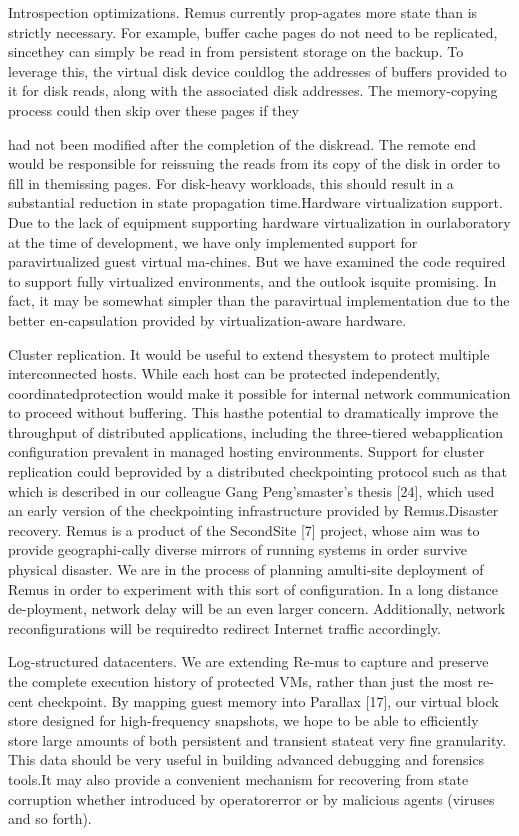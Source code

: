 Introspection optimizations. Remus currently prop-agates more state than is strictly necessary. For example,
buffer cache pages do not need to be replicated, sincethey can simply be read in from persistent storage on the
backup. To leverage this, the virtual disk device couldlog the addresses of buffers provided to it for disk reads,
along with the associated disk addresses. The memory-copying process could then skip over these pages if they

had not been modified after the completion of the diskread. The remote end would be responsible for reissuing
the reads from its copy of the disk in order to fill in themissing pages. For disk-heavy workloads, this should result in a substantial reduction in state propagation time.Hardware virtualization support. Due to the lack
of equipment supporting hardware virtualization in ourlaboratory at the time of development, we have only implemented support for paravirtualized guest virtual ma-chines. But we have examined the code required to support fully virtualized environments, and the outlook isquite promising. In fact, it may be somewhat simpler
than the paravirtual implementation due to the better en-capsulation provided by virtualization-aware hardware.

Cluster replication. It would be useful to extend thesystem to protect multiple interconnected hosts. While
each host can be protected independently, coordinatedprotection would make it possible for internal network
communication to proceed without buffering. This hasthe potential to dramatically improve the throughput of
distributed applications, including the three-tiered webapplication configuration prevalent in managed hosting
environments. Support for cluster replication could beprovided by a distributed checkpointing protocol such
as that which is described in our colleague Gang Peng'smaster's thesis [24], which used an early version of the
checkpointing infrastructure provided by Remus.Disaster recovery. Remus is a product of the SecondSite [7] project, whose aim was to provide geographi-cally diverse mirrors of running systems in order survive
physical disaster. We are in the process of planning amulti-site deployment of Remus in order to experiment
with this sort of configuration. In a long distance de-ployment, network delay will be an even larger concern.
Additionally, network reconfigurations will be requiredto redirect Internet traffic accordingly.

Log-structured datacenters. We are extending Re-mus to capture and preserve the complete execution history of protected VMs, rather than just the most re-cent checkpoint. By mapping guest memory into Parallax [17], our virtual block store designed for high-frequency snapshots, we hope to be able to efficiently
store large amounts of both persistent and transient stateat very fine granularity. This data should be very useful in building advanced debugging and forensics tools.It may also provide a convenient mechanism for recovering from state corruption whether introduced by operatorerror or by malicious agents (viruses and so forth).


